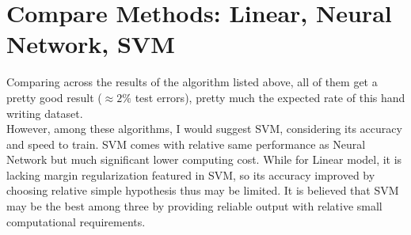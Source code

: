 \documentclass{article}
\def\math#1{$#1$}
\begin{document}
\section{Compare Methods: Linear, Neural Network, SVM}

Comparing across the results of the algorithm listed above, all of them get a pretty good result (\math{\approx 2\%} test errors), pretty much the expected rate of this hand writing dataset. \\ However, among these algorithms, I would suggest SVM, considering its accuracy and speed to train. SVM comes with relative same performance as Neural Network but much significant lower computing cost. While for Linear model, it is lacking margin regularization featured in SVM, so its accuracy improved by choosing relative simple hypothesis thus may be limited. It is believed that SVM may be the best among three by providing reliable output with relative small computational requirements.
\end{document}
